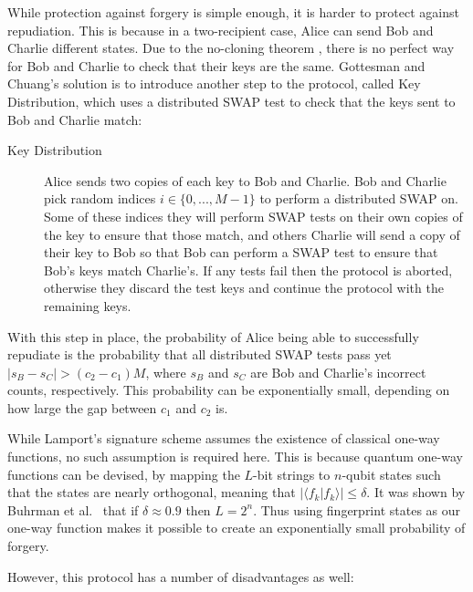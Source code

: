 \documentclass[%
 reprint,
 amsmath,amssymb,
 aps,
 pra,
]{revtex4-1}
\begin{document}
While protection against forgery is simple enough, it is harder to protect against repudiation. This is because in a two-recipient case, Alice can send Bob and Charlie different states. Due to the no-cloning theorem \cite{WZ82}, there is no perfect way for Bob and Charlie to check that their keys are the same. Gottesman and Chuang's solution is to introduce another step to the protocol, called Key Distribution, which uses a distributed SWAP test to check that the keys sent to Bob and Charlie match:

\begin{description}
\item[Key Distribution]Alice sends two copies of each key to Bob and Charlie. Bob and Charlie pick random indices $i \in \{0,...,M-1\}$ to perform a distributed SWAP on. Some of these indices they will perform SWAP tests on their own copies of the key to ensure that those match, and others Charlie will send a copy of their key to Bob so that Bob can perform a SWAP test to ensure that Bob's keys match Charlie's. If any tests fail then the protocol is aborted, otherwise they discard the test keys and continue the protocol with the remaining keys.
\end{description}

With this step in place, the probability of Alice being able to successfully repudiate is the probability that all distributed SWAP tests pass yet $|s_B - s_C| > (c_2 - c_1)M$, where $s_B$ and $s_C$ are Bob and Charlie's incorrect counts, respectively. This probability can be exponentially small, depending on how large the gap between $c_1$ and $c_2$ is.

While Lamport's signature scheme assumes the existence of classical one-way functions, no such assumption is required here. This is because quantum one-way functions can be devised, by mapping the $L$-bit strings to $n$-qubit states such that the states are nearly orthogonal, meaning that $|\langle f_k|f_k \rangle| \leq \delta$. It was shown by Buhrman et al.~\cite{PhysRevLett.87.167902} that if $\delta \approx 0.9$ then $L = 2^n$. Thus using fingerprint states as our one-way function makes it possible to create an exponentially small probability of forgery.

However, this protocol has a number of disadvantages as well:
\end{document}
